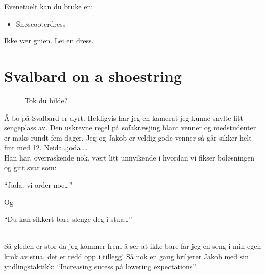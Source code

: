 Evenetuelt kan du bruke en:

\begin{itemize}
		\item Snøscooterdress
\end{itemize}

Ikke vær gnien. Lei en dress. \\



\section{Svalbard on a shoestring}

\begin{figure}[H]
	\centering
	\noindent{}
	\caption*{Tok du bilde?}
\label{fig:tokdubilde}
\end{figure}

Å bo på Svalbard er dyrt. Heldigvis har jeg en kamerat jeg
kunne snylte litt sengeplass av. Den uskrevne regel på sofakræsjing
blant venner og medstudenter er maks rundt fem dager. Jeg og Jakob er veldig gode venner så går sikker helt fint
med 12. Neida\ldots joda \ldots  \\

Han har, overraskende nok, vært litt unnvikende i hvordan vi fikser
boløsningen og
gitt svar som: 
\begin{dialogue}
	\item ``Jada, vi order noe\ldots''
\end{dialogue}
Og 
\begin{dialogue}
	\item ``Du kan sikkert bare slenge deg i stua\ldots''
\end{dialogue}\\
Så gleden er stor da jeg kommer frem
å ser at ikke bare får jeg en seng i min egen krok av stua, det er
redd opp i tillegg! Så nok en gang briljerer Jakob med sin
yndlingstaktikk: ``Increasing sucess på lowering expectations''.\\





